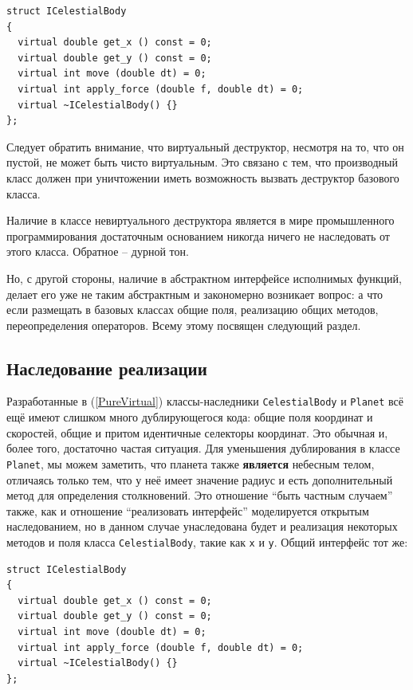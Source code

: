 \documentclass[a4paper,12pt,oneside]{article}
\begin{document}
\begin{lstlisting}
struct ICelestialBody
{
  virtual double get_x () const = 0;
  virtual double get_y () const = 0;
  virtual int move (double dt) = 0;
  virtual int apply_force (double f, double dt) = 0;
  virtual ~ICelestialBody() {}
};
\end{lstlisting}

Следует обратить внимание, что виртуальный деструктор, несмотря на то, что он пустой, не может быть чисто виртуальным. Это связано с тем, что производный класс должен при уничтожении иметь возможность вызвать деструктор базового класса.

Наличие в классе невиртуального деструктора является в мире промышленного программирования достаточным основанием никогда ничего не наследовать от этого класса. Обратное – дурной тон. 

Но, с другой стороны, наличие в абстрактном интерфейсе исполнимых функций, делает его уже не таким абстрактным и закономерно возникает вопрос: а что если размещать в базовых классах общие поля, реализацию общих методов, переопределения операторов. Всему этому посвящен следующий раздел.

\pagebreak
\subsection{Наследование реализации}

Разработанные в (\ref{PureVirtual}) классы-наследники \lstinline!CelestialBody! и \lstinline!Planet! всё ещё имеют слишком много дублирующегося кода: общие поля координат и скоростей, общие и притом идентичные селекторы координат. Это обычная и, более того, достаточно частая ситуация. Для уменьшения дублирования в классе \lstinline!Planet!, мы можем заметить, что планета также \textbf{является} небесным телом, отличаясь только тем, что у неё имеет значение радиус и есть дополнительный метод для определения столкновений. Это отношение ``быть частным случаем'' также, как и отношение ``реализовать интерфейс'' моделируется открытым наследованием, но в данном случае унаследована будет и реализация некоторых методов и поля класса \lstinline!CelestialBody!, такие как \lstinline!x! и \lstinline!y!. Общий интерфейс тот же:

\begin{lstlisting}
struct ICelestialBody
{
  virtual double get_x () const = 0;
  virtual double get_y () const = 0;
  virtual int move (double dt) = 0;
  virtual int apply_force (double f, double dt) = 0;
  virtual ~ICelestialBody() {}
};
\end{lstlisting}
\end{document}
